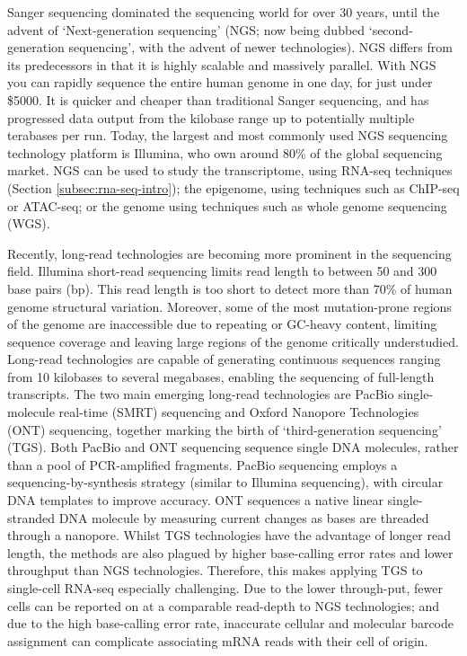 Sanger sequencing dominated the sequencing world for over 30 years, until the advent of `Next-generation sequencing' (NGS; now being dubbed `second-generation sequencing', with the advent of newer technologies).
NGS differs from its predecessors in that it is highly scalable and massively parallel.
With NGS you can rapidly sequence the entire human genome in one day, for just under \$5000.
It is quicker and cheaper than traditional Sanger sequencing, and has progressed data output from the kilobase range up to potentially multiple terabases per run.
Today, the largest and most commonly used NGS sequencing technology platform is Illumina, who own around 80\% of the global sequencing market.
NGS can be used to study the transcriptome, using RNA-seq techniques (Section \ref{subsec:rna-seq-intro}); the epigenome, using techniques such as ChIP-seq or ATAC-seq; or the genome using techniques such as whole genome sequencing (WGS).

Recently, long-read technologies are becoming more prominent in the sequencing field.
Illumina short-read sequencing limits read length to between 50 and 300 base pairs (bp)\@.
This read length is too short to detect more than 70\% of human genome structural variation.
Moreover, some of the most mutation-prone regions of the genome are inaccessible due to repeating or GC-heavy content, limiting sequence coverage and leaving large regions of the genome critically understudied\cite{logsdon2020long}.
Long-read technologies are capable of generating continuous sequences ranging from 10 kilobases to several megabases, enabling the sequencing of full-length transcripts.
The two main emerging long-read technologies are PacBio single-molecule real-time (SMRT) sequencing\cite{wenger2019accurate} and Oxford Nanopore Technologies (ONT) sequencing\cite{ip2015minion, jain2016oxford}, together marking the birth of `third-generation sequencing' (TGS).
Both PacBio and ONT sequencing sequence single DNA molecules, rather than a pool of PCR-amplified fragments.
PacBio sequencing employs a sequencing-by-synthesis strategy (similar to Illumina sequencing), with circular DNA templates to improve accuracy.
ONT sequences a native linear single-stranded DNA molecule by measuring current changes as bases are threaded through a nanopore\cite{weirather2017comprehensive}.
Whilst TGS technologies have the advantage of longer read length, the methods are also plagued by higher base-calling error rates and lower throughput than NGS technologies\cite{weirather2017comprehensive, philpott2021nanopore}.
Therefore, this makes applying TGS to single-cell RNA-seq especially challenging.
Due to the lower through-put, fewer cells can be reported on at a comparable read-depth to NGS technologies;
and due to the high base-calling error rate, inaccurate cellular and molecular barcode assignment can complicate associating mRNA reads with their cell of origin.

